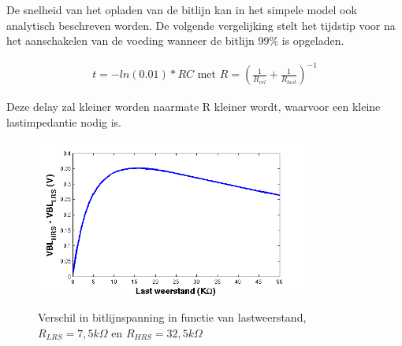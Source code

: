 De snelheid van het opladen van de bitlijn kan in het simpele model ook analytisch beschreven worden. De volgende vergelijking stelt het tijdstip voor na het aanschakelen van de voeding wanneer de bitlijn $99\%$ is opgeladen.

\begin{align}
t = -ln(0.01)*RC \text{ met } R = (\frac{1}{R_{cel}} + \frac{1}{R_{last}})^{-1}
\end{align}

Deze delay zal kleiner worden naarmate R kleiner wordt, waarvoor een kleine lastimpedantie nodig is.

\begin{figure}[!ht]
\centering
 \includegraphics[width=0.80\textwidth] {../fig/hfdst-last-rpiek.png} \label{fig:rpiek}
\caption[Verschil in bitlijnspanning in functie van lastweerstand]{Verschil in bitlijnspanning in functie van lastweerstand, $R_{LRS}=7,5 k \Omega$ en $R_{HRS}= 32,5 k \Omega$}
\end{figure}





